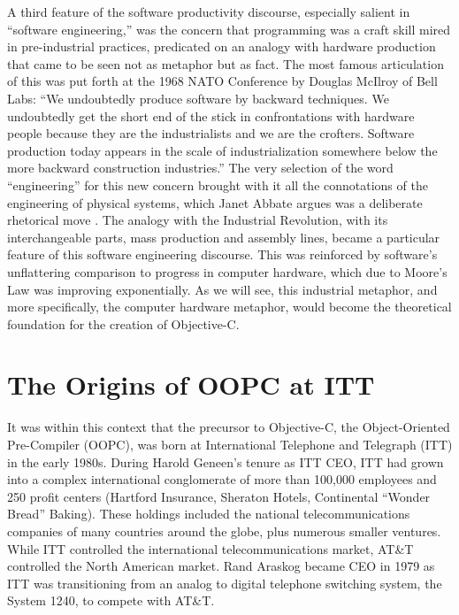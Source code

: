 \documentclass[acmsmall,screen]{acmart}
\begin{document}
A third feature of the software productivity discourse, especially salient in ``software engineering,'' was the concern that programming was a craft skill mired in pre-industrial practices, predicated on an analogy with hardware production that came to be seen not as metaphor but as fact. The most famous articulation of this was put forth at the 1968 NATO Conference by Douglas McIlroy of Bell Labs: ``We undoubtedly produce software by backward techniques. We undoubtedly get the short end of the stick in confrontations with hardware people because they are the industrialists and we are the crofters. Software production today appears in the scale of industrialization somewhere below the more backward construction industries.'' \citep[11]{mahoney_finding_2004} The very selection of the word ``engineering'' for this new concern brought with it all the connotations of the engineering of physical systems, which Janet Abbate argues was a deliberate rhetorical move \citep[97--105]{abbate_software_2012}. The analogy with the Industrial Revolution, with its interchangeable parts, mass production and assembly lines, became a particular feature of this software engineering discourse. This was reinforced by software's unflattering comparison to progress in computer hardware, which due to Moore's Law was improving exponentially. As we will see, this industrial metaphor, and more specifically, the computer hardware metaphor, would become the theoretical foundation for the creation of Objective-C. 

\section{The Origins of OOPC at ITT}
\label{sec-OOPC@ITT}
It was within this context that the precursor to Objective-C, the Object-Oriented Pre-Compiler (OOPC), was born at International Telephone and Telegraph (ITT) in the early 1980s. During Harold Geneen's tenure as ITT CEO, ITT had grown into a complex international conglomerate of more than 100,000 employees and 250 profit centers (Hartford Insurance, Sheraton Hotels, Continental ``Wonder Bread'' Baking). These holdings included the national telecommunications companies of many countries around the globe, plus numerous smaller ventures. While ITT controlled the international telecommunications market, AT\&T controlled the North American market. Rand Araskog became CEO in 1979 as ITT was transitioning from an analog to digital telephone switching system, the System 1240, to compete with AT\&T.
\end{document}
